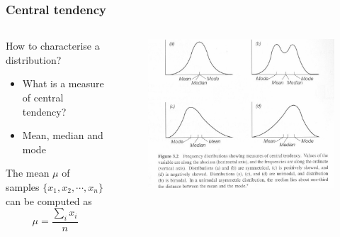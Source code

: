 \documentclass[10pt, compress]{beamer}
\begin{document}
\begin{frame}
    \frametitle{Central tendency}
    \begin{columns}
        \begin{block}{How to characterise a distribution?}
            \begin{itemize}
                \item \alert{What is a measure of central tendency?}
                \item Mean, median and mode
            \end{itemize}
            \smallskip
            The mean $\mu$ of samples $\{x_1,x_2,\cdots,x_n\}$ can be computed
            as
            \begin{equation}
                \mu = \frac{\sum_i x_i}{n}
            \end{equation}
        \end{block}
        \begin{block}{}
            \begin{figure}
                \begin{center}
                    \includegraphics[scale=0.5]{img/central_tendancy.png}
                \end{center}
            \end{figure}
        \end{block}
    \end{columns}
\end{frame}
\end{document}
